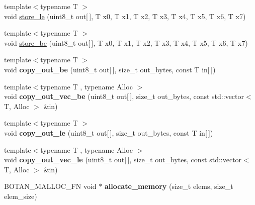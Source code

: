 \begin{DoxyCompactItemize}
{\footnotesize template$<$typename T $>$ }\\void \mbox{\hyperlink{namespace_botan_a7b4ba47d9124f22d4f31e9a1e6522053}{store\+\_\+le}} (uint8\+\_\+t out\mbox{[}$\,$\mbox{]}, T x0, T x1, T x2, T x3, T x4, T x5, T x6, T x7)
\item 
{\footnotesize template$<$typename T $>$ }\\void \mbox{\hyperlink{namespace_botan_ac7562c0698d83b375aef50abc64bcdd2}{store\+\_\+be}} (uint8\+\_\+t out\mbox{[}$\,$\mbox{]}, T x0, T x1, T x2, T x3, T x4, T x5, T x6, T x7)
\item 
\mbox{\label{namespace_botan_ae5951af5d67ee89f552e66abe8a19de7}} 
{\footnotesize template$<$typename T $>$ }\\void {\bfseries copy\+\_\+out\+\_\+be} (uint8\+\_\+t out\mbox{[}$\,$\mbox{]}, size\+\_\+t out\+\_\+bytes, const T in\mbox{[}$\,$\mbox{]})
\item 
\mbox{\label{namespace_botan_af10bb467867948b805d2ed47e520ee08}} 
{\footnotesize template$<$typename T , typename Alloc $>$ }\\void {\bfseries copy\+\_\+out\+\_\+vec\+\_\+be} (uint8\+\_\+t out\mbox{[}$\,$\mbox{]}, size\+\_\+t out\+\_\+bytes, const std\+::vector$<$ T, Alloc $>$ \&in)
\item 
\mbox{\label{namespace_botan_a0c13ee419fb7aec9be106be04a7d58b0}} 
{\footnotesize template$<$typename T $>$ }\\void {\bfseries copy\+\_\+out\+\_\+le} (uint8\+\_\+t out\mbox{[}$\,$\mbox{]}, size\+\_\+t out\+\_\+bytes, const T in\mbox{[}$\,$\mbox{]})
\item 
\mbox{\label{namespace_botan_a50163d1f1821b426712ed51ea5f55f89}} 
{\footnotesize template$<$typename T , typename Alloc $>$ }\\void {\bfseries copy\+\_\+out\+\_\+vec\+\_\+le} (uint8\+\_\+t out\mbox{[}$\,$\mbox{]}, size\+\_\+t out\+\_\+bytes, const std\+::vector$<$ T, Alloc $>$ \&in)
\item 
\mbox{\label{namespace_botan_aac9bf025334b7c74a6c14addbd481577}} 
B\+O\+T\+A\+N\+\_\+\+M\+A\+L\+L\+O\+C\+\_\+\+FN void $\ast$ {\bfseries allocate\+\_\+memory} (size\+\_\+t elems, size\+\_\+t elem\+\_\+size)
\item 
\mbox{\label{namespace_botan_a46524142ffdc0dfeb7c58611b9e0046d}} 

\end{DoxyCompactItemize}
